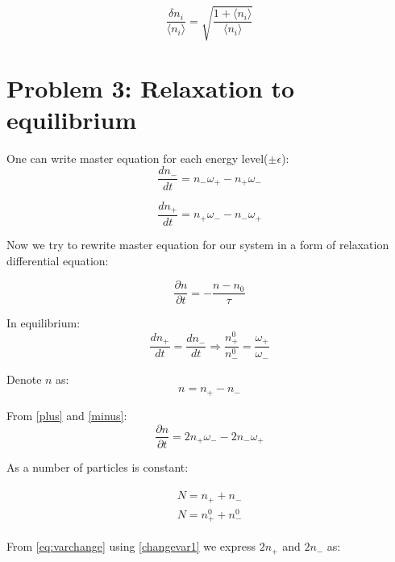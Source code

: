 \documentclass[10pt]{article}
\begin{document}
\begin{equation}
\frac{\delta n_i}{\langle n_i\rangle} = \sqrt{\frac{1 + \langle n_i\rangle}{\langle n_i\rangle}}
\end{equation}

\section{Problem 3: Relaxation to equilibrium}
One can write master equation for each energy level($\pm \epsilon$):
\begin{equation}\label{minus}
\frac{d n_{-}}{dt} = n_{-} \omega_{+} - n_{+} \omega_{-}
\end{equation}

\begin{equation}\label{plus}
\frac{d n_{+}}{dt} = n_{+} \omega_{-} - n_{-} \omega_{+}
\end{equation}

Now we try to rewrite master equation for our system in a form of relaxation differential equation:

\begin{equation}\label{qw}
\frac{\partial n}{\partial t} = - \frac{ n - n_0}{\tau}
\end{equation}

In equilibrium:
\begin{equation}\label{plusminus}
\frac{d n_{+}}{dt} = \frac{d n_{-}}{dt} \Rightarrow \frac{n_{+}^0}{n_{-}^0} = \frac{\omega_{+}}{\omega_{-}} 
\end{equation}

Denote $n$ as:
\begin{equation}\label{changevar1}
n= n_{+} - n_{-}
\end{equation}

From \ref{plus} and \ref{minus}:
\begin{equation}\label{plusminusdt}
\frac{\partial n}{\partial t} = 2n_{+}\omega_{-} - 2n_{-}\omega_{+}
\end{equation}

As a number of particles is constant:

\begin{align}
\begin{split}
N = n_{+} + n_{-} \\
N = n_{+}^0 + n_{-}^0
\label{eq:varchange}
\end{split}
\end{align}

From \ref{eq:varchange} using \ref{changevar1} we express $2n_{+}$ and $2n_{-}$ as:
\end{document}
